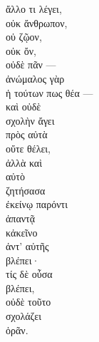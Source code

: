{\begin{greek}
\tabto{2em} ἄλλο τι λέγει, \\
\tabto{4em} οὐκ ἄνθρωπον, \\
\tabto{4em} οὐ ζῷον, \\
\tabto{4em} οὐκ ὄν, \\
\tabto{4em} οὐδὲ πᾶν —\\
ἀνώμαλος γὰρ \\
ἡ τούτων πως θέα —\\
καὶ οὐδὲ \\
\tabto{2em} σχολὴν ἄγει \\
\tabto{4em} \tabto{2em} πρὸς αὐτὰ \\
\tabto{2em} οὔτε θέλει, \\
\tabto{4em} ἀλλὰ καὶ \\
\tabto{4em} αὐτὸ \\
\tabto{4em} ζητήσασα \\
\tabto{6em} ἐκείνῳ παρόντι \\
\tabto{4em} ἀπαντᾷ \\
\tabto{4em} κἀκεῖνο \\
\tabto{6em} ἀντ' αὐτῆς \\
\tabto{4em} βλέπει· \\
τίς δὲ οὖσα \\
βλέπει, \\
οὐδὲ τοῦτο \\
\tabto{2em} σχολάζει \\
\tabto{4em} ὁρᾶν.\\

\end{greek}
}

